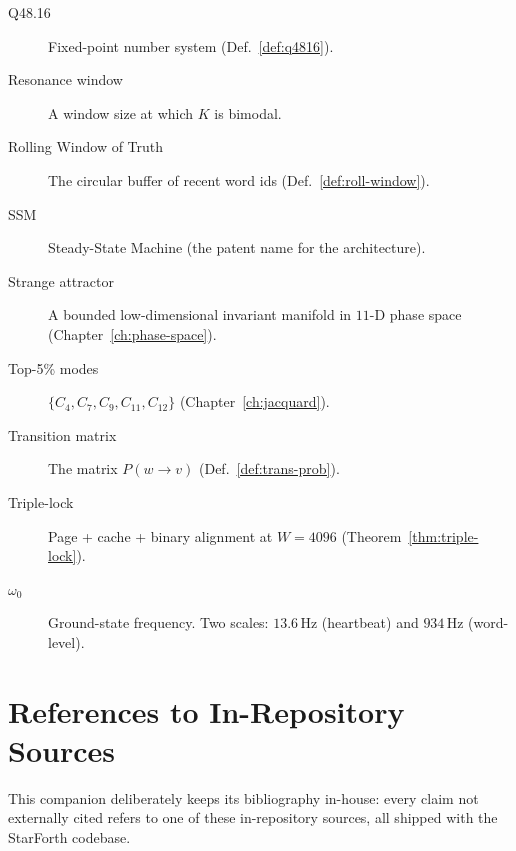 \documentclass[11pt,letterpaper,openany]{book}
\theoremstyle{definition}
\theoremstyle{plain}
\begin{document}
\begin{description}
  \item[Q48.16] Fixed-point number system (Def.~\ref{def:q4816}).
  \item[Resonance window] A window size at which $K$ is bimodal.
  \item[Rolling Window of Truth] The circular buffer of recent word ids
    (Def.~\ref{def:roll-window}).
  \item[SSM] Steady-State Machine (the patent name for the architecture).
  \item[Strange attractor] A bounded low-dimensional invariant manifold
    in $11$-D phase space (Chapter~\ref{ch:phase-space}).
  \item[Top-5\% modes] $\{C_4, C_7, C_9, C_{11}, C_{12}\}$
    (Chapter~\ref{ch:jacquard}).
  \item[Transition matrix] The matrix $P(w\to v)$
    (Def.~\ref{def:trans-prob}).
  \item[Triple-lock] Page + cache + binary alignment at $W = 4096$
    (Theorem~\ref{thm:triple-lock}).
  \item[$\omega_0$] Ground-state frequency. Two scales:
    $13.6$\,Hz (heartbeat) and $934$\,Hz (word-level).
\end{description}

\chapter{References to In-Repository Sources}
\label{app:refs}

This companion deliberately keeps its bibliography in-house: every claim
not externally cited refers to one of these in-repository sources, all
shipped with the StarForth codebase.
\end{document}
